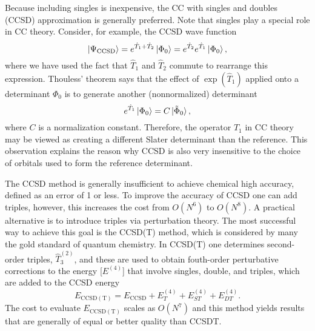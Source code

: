\documentclass[../Main/chem532-notes.tex]{subfiles}
\begin{document}
Because including singles is inexpensive, the CC with singles and doubles (CCSD) approximation is generally preferred. Note that singles play a special role in CC theory. Consider, for example, the CCSD wave function
\begin{equation}
\ket{\Psi_{\mathrm{CCSD}}} = e^{\hat{T}_1 + \hat{T}_2} \ket{\Phi_0}
= e^{\hat{T}_2}e^{\hat{T}_1} \ket{\Phi_0},
\end{equation}
where we have used the fact that $\hat{T}_1$ and $\hat{T}_2$ commute to rearrange this expression.
Thouless' theorem says that the effect of  $\exp(\hat{T}_1)$ applied onto a determinant $\Phi_0$ is to generate another (nonnormalized) determinant
\begin{equation}
e^{\hat{T}_1} \ket{\Phi_0} = C \ket{\tilde{\Phi}_0},
\end{equation}
where $C$ is a normalization constant.
Therefore, the operator $\hat{T}_1$ in CC theory may be viewed as creating a different Slater determinant than the reference. This observation explains the reason why CCSD is also very insensitive to the choice of orbitals used to form the reference determinant.

The CCSD method is generally insufficient to achieve chemical high accuracy, defined as an error of 1 \kcal or less.
To improve the accuracy of CCSD one can add triples, however, this increases the cost from $O(N^6)$ to $O(N^8)$.
A practical alternative is to introduce triples via perturbation theory. The most successful way to achieve this goal is the CCSD(T) method, which is considered by many the gold standard of quantum chemistry.
In CCSD(T) one determines second-order triples, $\hat{T}_3^{(2)}$, and these are used to obtain fouth-order perturbative corrections to the energy [$E^{(4)}$] that involve singles, double, and triples, which are added to the CCSD energy
\begin{equation}
E_{\mathrm{CCSD(T)}} = E_{\mathrm{CCSD}} + E_{T}^{(4)} + E_{ST}^{(4)} + E_{DT}^{(4)}.
\end{equation}
The cost to evaluate $E_{\mathrm{CCSD(T)}}$ scales as $O(N^7)$ and this method yields results that are generally of equal or better quality than CCSDT.
\end{document}
